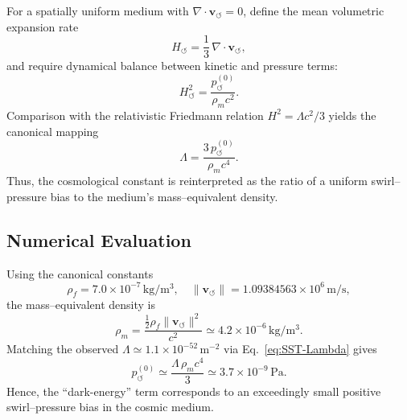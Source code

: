 \documentclass[10pt,reprint,aps,onecolumn,nofootinbib]{revtex4-2}
\begin{document}
            For a spatially uniform medium with $\nabla\!\cdot\!\mathbf{v}_{\!\boldsymbol{\circlearrowleft}} = 0$, define the mean volumetric expansion rate
            \begin{equation}
            H_{\!\circlearrowleft} = \frac{1}{3}\,\nabla\!\cdot\!\mathbf{v}_{\!\boldsymbol{\circlearrowleft}},
            \end{equation}
            and require dynamical balance between kinetic and pressure terms:
            \begin{equation}
            H_{\!\circlearrowleft}^{2} = \frac{p_{\!\circlearrowleft}^{(0)}}{\rho_{\!m} c^{2}}.
            \end{equation}
            Comparison with the relativistic Friedmann relation $H^{2} = \Lambda c^{2}/3$ yields the canonical mapping
            \begin{equation}
            \Lambda = \frac{3\,p_{\!\circlearrowleft}^{(0)}}{\rho_{\!m} c^{4}}.
            \label{eq:SST-Lambda}
            \end{equation}
            Thus, the cosmological constant is reinterpreted as the ratio of a uniform swirl--pressure bias to the medium’s mass--equivalent density.

        \subsection{Numerical Evaluation}

            Using the canonical constants
            \[
                \rho_{\!f} = 7.0\times10^{-7}\,\mathrm{kg/m^{3}},
                \quad
                \lVert\mathbf{v}_{\!\boldsymbol{\circlearrowleft}}\rVert = 1.09384563\times10^{6}\,\mathrm{m/s},
            \]
            the mass--equivalent density is
            \[
                \rho_{\!m} = \frac{\tfrac12\rho_{\!f}\lVert\mathbf{v}_{\!\boldsymbol{\circlearrowleft}}\rVert^{2}}{c^{2}}
                \simeq 4.2\times10^{-6}\,\mathrm{kg/m^{3}}.
            \]
            Matching the observed $\Lambda\simeq1.1\times10^{-52}\,\mathrm{m^{-2}}$ via Eq.~\eqref{eq:SST-Lambda} gives
            \begin{equation}
            p_{\!\circlearrowleft}^{(0)} \simeq
            \frac{\Lambda\,\rho_{\!m} c^{4}}{3}
            \simeq 3.7\times10^{-9}\,\mathrm{Pa}.
            \end{equation}
            Hence, the ``dark-energy'' term corresponds to an exceedingly small positive swirl--pressure bias in the cosmic medium.
\end{document}
